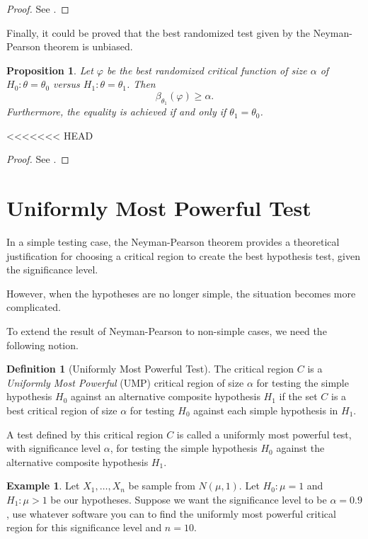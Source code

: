 \documentclass[
  openany]{book}
\newtheorem{proposition}{Proposition}[chapter]
\theoremstyle{definition}
\newtheorem{definition}{Definition}[chapter]
\theoremstyle{definition}
\newtheorem{example}{Example}[chapter]
\theoremstyle{definition}
\theoremstyle{definition}
\theoremstyle{remark}
\begin{document}
\begin{proof}
See \citep[Theorem 3.2.1]{lehmann2005testing}.
\end{proof}

Finally, it could be proved that the best randomized test given by the Neyman-Pearson theorem
is unbiased.

\begin{proposition}
Let \(\varphi\) be the best randomized critical function of size \(\alpha\) of \(H_0: \theta = \theta_0\)
versus \(H_1: \theta = \theta_1\).
Then
\[\beta_{\theta_1}(\varphi) \geq \alpha.\]
Furthermore,
the equality is achieved if and only if \(\theta_1 = \theta_0\).
\end{proposition}

<<<<<<< HEAD
\begin{proof}
See \citep[Corollary 3.2.1]{lehmann2005testing}.
\end{proof}

\section{Uniformly Most Powerful Test}\label{uniformly-most-powerful-test}

In a simple testing case, the Neyman-Pearson theorem provides a theoretical justification for
choosing a critical region to create the best hypothesis test, given
the significance level.

However, when the hypotheses are no longer simple, the situation becomes more complicated.

To extend the result of Neyman-Pearson to non-simple cases, we need the following notion.

\begin{definition}[Uniformly Most Powerful Test]
The critical region \(C\) is a \emph{Uniformly Most Powerful} (UMP) critical region
of size \(\alpha\) for testing the simple hypothesis \(H_0\) against an
alternative composite hypothesis \(H_1\) if the set \(C\) is a best critical
region of size \(\alpha\) for testing \(H_0\) against each simple
hypothesis in \(H_1\).

A test defined by this critical region \(C\) is
called a uniformly most powerful test, with significance level \(\alpha\),
for testing the simple hypothesis \(H_0\) against the alternative composite hypothesis \(H_1\).
\end{definition}

\begin{example}
Let \(X_1, \dots, X_n\) be sample from \(N(\mu, 1)\).
Let \(H_0: \mu = 1\) and \(H_1: \mu >1\) be our hypotheses.
Suppose we want the significance level to be \(\alpha = 0.9\),
use whatever software you can to find the uniformly most
powerful critical region for this significance level and \(n = 10\).
\end{example}
\end{document}
